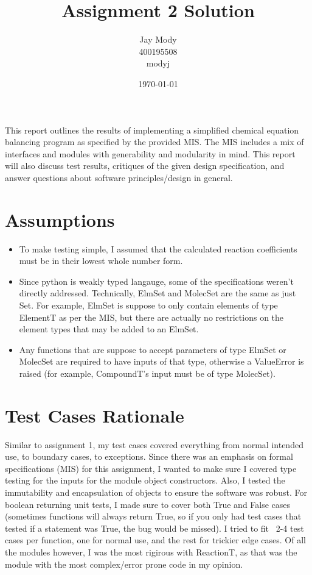 \documentclass[12pt]{article}
\title{Assignment 2 Solution}
\author{Jay Mody\\400195508\\modyj}
\date{\today}
\begin{document}
\maketitle


This report outlines the results of implementing a simplified chemical equation balancing program as specified by the provided MIS. The MIS includes a mix of interfaces and modules with generability and modularity in mind. This report will also discuss test results, critiques of the given design specification, and answer questions about software principles/design in general.


\section{Assumptions}
\begin{itemize}
    \item To make testing simple, I assumed that the calculated reaction coefficients must be in their lowest whole number form.
    \item Since python is weakly typed langauge, some of the specifications weren't directly addressed. Technically, ElmSet and MolecSet are the same as just Set. For example, ElmSet is suppose to only contain elements of type ElementT as per the MIS, but there are actually no restrictions on the element types that may be added to an ElmSet.
    \item Any functions that are suppose to accept parameters of type ElmSet or MolecSet are required to have inputs of that type, otherwise a ValueError is raised (for example, CompoundT's input must be of type MolecSet).
\end{itemize}


\clearpage
\section{Test Cases Rationale}
Similar to assignment 1, my test cases covered everything from normal intended use, to boundary cases, to exceptions. Since there was an emphasis on formal specifications (MIS) for this assignment, I wanted to make sure I covered type testing for the inputs for the module object constructors. Also, I tested the immutability and encapsulation of objects to ensure the software was robust. For boolean returning unit tests, I made sure to cover both True and False cases (sometimes functions will always return True, so if you only had test cases that tested if a statement was True, the bug would be missed). I tried to fit ~2-4 test cases per function, one for normal use, and the rest for trickier edge cases. Of all the modules however, I was the most rigirous with ReactionT, as that was the module with the most complex/error prone code in my opinion.
\end{document}
